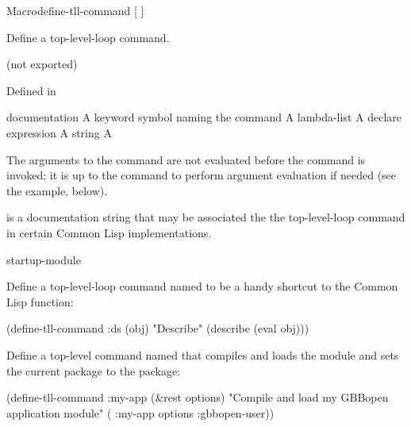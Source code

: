 \documentclass[10pt,twoside,english,pdftex]{article}
\begin{document}

\begin{functiondoc}{Macro}{define-tll-command}{ [\superstar{} \vbar{}
     ] \superstar}
%
%
%
  
\fnsyntax

\fnpurpose Define a top-level-loop command.

\fnpackage {} (not exported)

\fnmodule Defined in 

\fnargs
\begin{args}{documentation}
 A keyword symbol naming the command
 A lambda-list
\arg[declaration] A declare expression
\arg[documentation] A string
\arg[form] A 
\end{args}

\fndescription 
The arguments to the command are not evaluated before the command is
invoked; it is up to the command to perform argument evaluation if
needed (see the example, below).

 is a documentation string that may be associated
the the top-level-loop command  in certain Common
Lisp implementations.

\begin{alsos}{startup-module}
\end{alsos}

\fnexamples
Define a top-level-loop command named  to be a handy
shortcut to the Common Lisp  function:
\begin{example}
  (define-tll-command :ds (obj)
    "Describe"
    (describe (eval obj)))
\end{example}

Define a top-level command named  that compiles
and loads the module  and sets the current package
to the  package:
\begin{example}
  (define-tll-command :my-app (&rest options)
    "Compile and load my GBBopen application module"
    ( :my-app options :gbbopen-user))
\end{example} 

\end{functiondoc}
\end{document}
